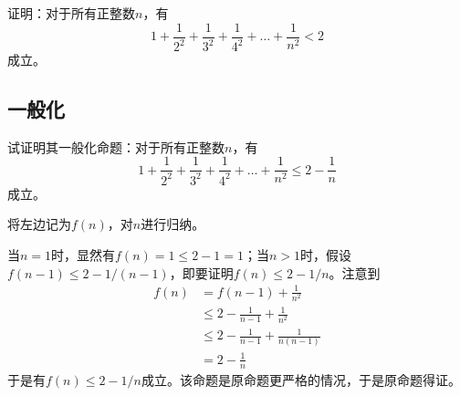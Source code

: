 

证明：对于所有正整数$n$，有
\[ 1 + \frac1{2^2} + \frac1{3^2} + \frac1{4^2} + \dots + \frac1{n^2} < 2 \]
成立。

\subsection{一般化}

试证明其一般化命题：对于所有正整数$n$，有
\[ 1 + \frac1{2^2} + \frac1{3^2} + \frac1{4^2} + \dots + \frac1{n^2} \le 2 - \frac1n \]
成立。

将左边记为$f(n)$，对$n$进行归纳。

当$n = 1$时，显然有$f(n) = 1 \le 2 - 1 = 1$；当$n > 1$时，假设$f(n - 1) \le 2 - 1/(n - 1)$，即要证明$f(n) \le 2 - 1/n$。注意到
\begin{align*}
  f(n) &= f(n - 1) + \frac1{n^2} \\
  &\le 2 - \frac1{n - 1} + \frac1{n^2} \\
  &\le 2 - \frac1{n - 1} + \frac1{n(n - 1)} \\
  &= 2 - \frac1n
\end{align*}
于是有$f(n) \le 2 - 1/n$成立。该命题是原命题更严格的情况，于是原命题得证。
